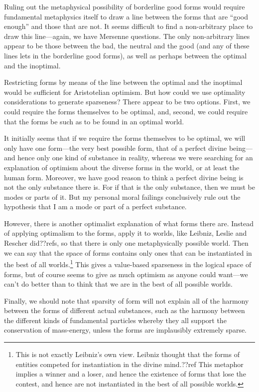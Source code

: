 Ruling out the metaphysical possibility of borderline good forms would require fundamental metaphysics itself to 
draw a line between the forms that are ``good enough'' and those that are not. It seems difficult to find a non-arbitrary
place to draw this line---again, we have Mersenne questions. The only non-arbitrary lines appear to be those between
the bad, the neutral and the good (and any of these lines lets in the borderline good forms), as well as perhaps 
between the optimal and the inoptimal.

Restricting forms by means of the line between the optimal and the inoptimal would be sufficient for Aristotelian 
optimism. But how could we use optimality considerations to generate sparseness? There appear to be two options. First,
we could require the forms themselves to be optimal, and, second, we could require that the forms be such as to be found
in an optimal world. 

It initially seems that if we require the forms themselves to be optimal, we will only have one form---the very best
possible form, that of a perfect divine being---and hence only one kind of substance in reality, whereas we were searching for an 
explanation of optimism about the diverse forms in the world, or at least the human form. Moreover, we have good reason to 
think a perfect divine being is not the only substance there is. For if that is the only substance, then we must be modes or 
parts of it. But my personal moral failings conclusively rule out the hypothesis that I am a mode or part of a perfect 
substance.

However, there is another optimalist explanation of what forms there are. Instead of applying optimalism to the forms, 
apply it to worlds, like Leibniz, Leslie and Rescher did??refs, so that there is only one metaphysically possible world. 
Then we can say that the space of forms contains only ones that 
can be instantiated in the best of all worlds.\footnote{This is not exactly Leibniz's own view. Leibniz thought
that the forms of entities competed for instantiation in the divine mind.??ref This metaphor implies a winner and a loser,
and hence the existence of forms that lose the contest, and hence are not instantiated in the best of all possible worlds.} 
This gives a value-based sparseness in the logical space of forms, but of course seems to give as much optimism as anyone could
want---we can't do better than to think that we are in the best of all possible worlds. 

Finally, we should note that sparsity of form will not explain all of the harmony between the forms of different 
actual substances, such as the harmony between the different kinds of fundamental particles whereby they all support the conservation of mass-energy, unless the forms are implausibly extremely sparse.

